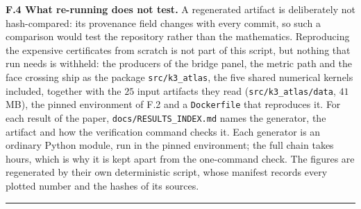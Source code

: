 \textbf{F.4 What re-running does not test.} A regenerated artifact is deliberately not hash-compared: its provenance field changes with every commit, so such a comparison would test the repository rather than the mathematics. Reproducing the expensive certificates from scratch is not part of this script, but nothing that run needs is withheld: the producers of the bridge panel, the metric path and the face crossing ship as the package \texttt{src/\allowbreak{}k3\_\allowbreak{}atlas}, the five shared numerical kernels included, together with the \(25\) input artifacts they read (\texttt{src/\allowbreak{}k3\_\allowbreak{}atlas/\allowbreak{}data}, \(41\) MB), the pinned environment of F.2 and a \texttt{Dockerfile} that reproduces it. For each result of the paper, \texttt{docs/\allowbreak{}RESULTS\_\allowbreak{}INDEX.\allowbreak{}md} names the generator, the artifact and how the verification command checks it. Each generator is an ordinary Python module, run in the pinned environment; the full chain takes hours, which is why it is kept apart from the one-command check. The figures are regenerated by their own deterministic script, whose manifest records every plotted number and the hashes of its sources.

\begin{center}\rule{\linewidth}{0.5pt}\end{center}

